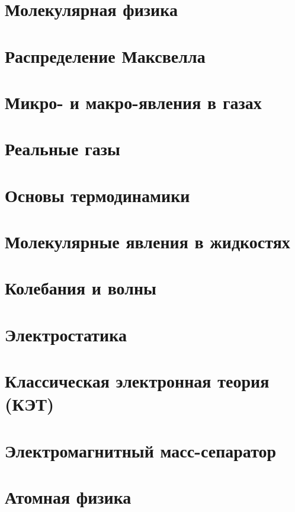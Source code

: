 \documentclass[12pt,epsfig,color,russian]{book}
\begin{document}
\chapter{Молекулярная физика}


\chapter{Распределение Максвелла}


\chapter{Микро- и макро-явления в газах}


\chapter{Реальные газы}


\chapter{Основы термодинамики}


\chapter{Молекулярные явления в жидкостях}


\chapter{Колебания и волны}


\chapter{Электростатика}


\chapter{Классическая электронная теория (КЭТ)}


\chapter{Электромагнитный масс-сепаратор}


\chapter{Атомная физика}


\backmatter
\end{document}
